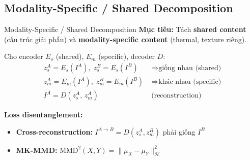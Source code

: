 \documentclass{beamer}
\begin{document}
\subsection{Modality-Specific / Shared Decomposition}

\begin{frame}{Modality-Specific / Shared Decomposition}
    \small
    \textbf{Mục tiêu:} Tách \textbf{shared content} (cấu trúc giải phẫu) và \textbf{modality-specific content} (thermal, texture riêng).

    \vspace{0.1cm}
    Cho encoder $E_s$ (shared), $E_m$ (specific), decoder $D$:
    \vspace{-0.1cm}
    \begin{align}
        z_s^A = E_s(I^A),\; z_s^B = E_s(I^B) &\;\Rightarrow \text{giống nhau (shared)} \nonumber \\
        z_m^A = E_m(I^A),\; z_m^B = E_m(I^B) &\;\Rightarrow \text{khác nhau (specific)} \nonumber \\
        I^A = D(z_s^A,\, z_m^A) &\;\text{(reconstruction)}
    \end{align}

    \vspace{-0.1cm}
    \textbf{Loss disentanglement:}
    \begin{itemize}\setlength{\itemsep}{2pt}
        \item \textbf{Cross-reconstruction:} $I^{A \to B} = D(z_s^A, z_m^B)$ phải giống $I^B$
        \item \textbf{MK-MMD:} $\text{MMD}^2(X,Y) = \|\mu_X - \mu_Y\|^2_{\mathcal{H}}$
    \end{itemize}
\end{frame}
\end{document}
